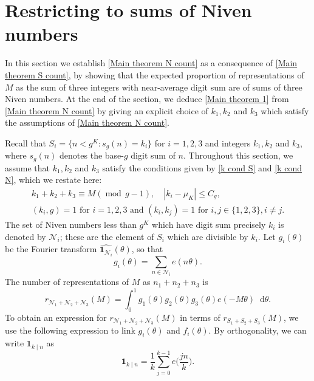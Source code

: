 \documentclass[hidelinks,11pt,reqno]{amsart}
\renewcommand{\leq}{\leqslant}
\newcommand{\st}{\ensuremath{:}}
\newcommand{\ind}{\mathbf{1}}
\newcommand*\dif{\mathop{}\!\mathrm{d}}
\theoremstyle{remark}
\newcommand{\md}[1]{\ensuremath{(\operatorname{mod}\, #1)}}
\begin{document}
\section{Restricting to sums of Niven numbers}\label{section divisibility}
In this section we establish \cref{Main theorem N count} as a consequence of \cref{Main theorem S count}, by showing that the expected proportion of representations of $M$ as the sum of three integers with near-average digit sum are of sums of three Niven numbers. At the end of the section, we deduce \cref{Main theorem 1} from \cref{Main theorem N count} by giving an explicit choice of $k_{1},k_{2}$ and $k_{3}$ which satisfy the assumptions of \cref{Main theorem N count}.

Recall that $S_{i}=\{n<g^{K}\st s_{g}(n)=k_{i}\}$ for $i=1,2,3$ and integers $k_{1},k_{2}$ and $k_{3}$, where $s_{g}(n)$ denotes the base-$g$ digit sum of $n$. Throughout this section, we assume that $k_{1},k_{2}$ and $k_{3}$ satisfy the conditions given by \cref{k cond S} and \cref{k cond N}, which we restate here:
\begin{gather*}
    k_{1}+k_{2}+k_{3}\equiv M \md{g-1}, \hspace{1em} |k_{i}-\mu_{K}|\leq C_{g}, \nonumber\\
    (k_{i},g)=1 \textrm{ for }i=1,2,3 \textrm{ and }(k_{i},k_{j})=1 \textrm{ for }i,j\in \{1,2,3\} ,i\neq j.
\end{gather*}
The set of Niven numbers less than $g^{K}$ which have digit sum precisely $k_{i}$ is denoted by $\mathcal{N}_{i}$; these are the element of $S_{i}$ which are divisible by $k_{i}$. Let $g_{i}(\theta)$ be the Fourier transform $\widehat{\ind_{\mathcal{N}_{i}}}(\theta)$, so that 
\begin{equation*}
    g_{i}(\theta)=\sum_{n\in \mathcal{N}_{i}}e(n\theta).
\end{equation*}
The number of representations of $M$ as $n_{1}+n_{2}+n_{3}$ is
\begin{equation}\label{Eq counting n_1 n_2 n_3 reps}
    r_{\mathcal{N}_{1}+\mathcal{N}_{2}+\mathcal{N}_{3}}(M)=\int_{0}^{1}g_{1}(\theta)g_{2}(\theta)g_{3}(\theta)e(-M\theta)\dif \theta.
\end{equation}
To obtain an expression for $r_{\mathcal{N}_{1}+\mathcal{N}_{2}+\mathcal{N}_{3}}(M)$ in terms of $r_{S_{1}+S_{2}+S_{3}}(M)$, we use the following expression to link $g_{i}(\theta)$ and $f_{i}(\theta)$. By orthogonality, we can write $\ind_{k\mid n}$ as
\begin{equation*}
    \ind_{k\mid n}=\frac{1}{k}\sum_{j=0}^{k-1}e\big(\frac{jn}{k}\big).
\end{equation*}
\end{document}
